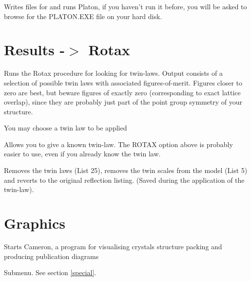 \documentclass[10pt,a4paper]{report}
\begin{document}
Writes files for and runs Platon, if you haven't run it before, you
will be asked to browse for the PLATON.EXE file on your hard disk.



\section{Results -$>$ Rotax}
\label{rotax} 


\bigskip{}




Runs the Rotax procedure for looking for twin-laws. Output consists
of a selection of possible twin laws with associated figures-of-merit.
Figures closer to zero are best, but beware figures of exactly zero
(corresponding to exact lattice overlap), since they are probably just
part of the point group symmetry of your structure.


You may choose a twin law to be applied





\bigskip{}




Allows you to give a known twin-law. The ROTAX option above is probably
easier to use, even if you already know the twin law.





\bigskip{}




Removes the twin laws (List 25), removes the twin scales from the model
(List 5) and reverts to the original reflection listing. (Saved during
the application of the twin-law).


\section{Graphics}




\bigskip{}




Starts Cameron, a program for visualising crystals structure packing and
producing publication diagrams





\bigskip{}




Submenu. See section \ref{special}.
\end{document}
